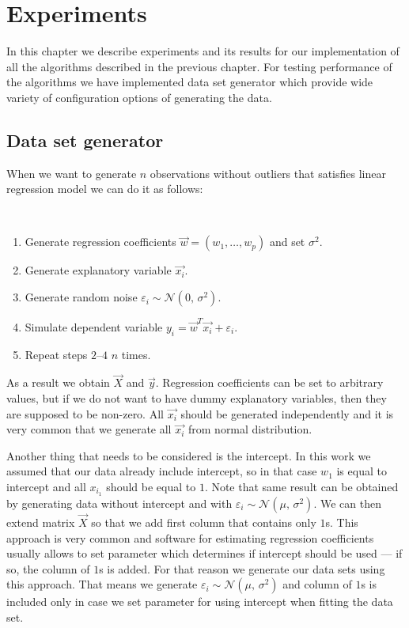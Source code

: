 \chapter{Experiments} \label{chapterexperiments}
In this chapter we describe experiments and its results for our implementation of all the algorithms described in the previous chapter.
For testing performance of the algorithms we have implemented data set generator which provide wide variety of configuration options of generating the data.

\section{Data set generator}
When we want to generate $n$ observations without outliers that satisfies linear regression model we can do it as follows:

\begin{algo} \label{generate:linear:model}
    \mbox{}\vspace{\dimexpr-\baselineskip-\topsep}
\\
    \begin{enumerate}
        \item Generate regression coefficients $\vec{w} = (w_1, \ldots, w_p)$ and set $\sigma^{2}$.
        \item Generate explanatory variable $\vec{x_i}$.
        \item Generate random noise $\varepsilon_i \sim \mathcal{N}(0,\,\sigma^{2})$.
        \item Simulate dependent variable $y_i = \vec{w}^T\vec{x_i} + \varepsilon_i$.
        \item Repeat steps $2$--$4$ $n$ times.
    \end{enumerate}
\end{algo}
As a result we obtain $\vec{X}$ and $\vec{y}$. Regression coefficients can be set to arbitrary values, but if we do not want to have dummy explanatory variables, then they are supposed to be non-zero. All $\vec{x_i}$ should be generated independently and it is very common that we generate all $\vec{x_i}$ from normal distribution. 

Another thing that needs to be considered is the intercept. In this work we assumed that our data already include intercept, so in that case $w_1$ is equal to intercept and all $x_{i_1}$ should be equal to $1$. Note that same result can be obtained by generating data without intercept and with $\varepsilon_i \sim \mathcal{N}(\mu,\,\sigma^{2})$. We can then extend matrix $\vec{X}$ so that we add first column that contains only $1$s. This approach is very common and software for estimating regression coefficients usually allows to set parameter which determines if intercept should be used --- if so, the column of $1$s is added. For that reason we generate our data sets using this approach. That means we generate $\varepsilon_i \sim \mathcal{N}(\mu,\,\sigma^{2})$ and column of $1$s is included only in case we set parameter for using intercept when fitting the data set. 


